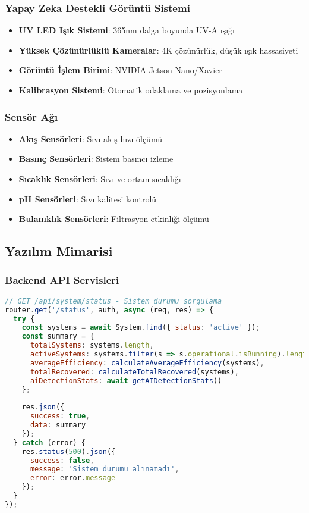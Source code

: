 \documentclass[12pt,a4paper]{article}
\begin{document}
\subsubsection{Yapay Zeka Destekli Görüntü Sistemi}
\begin{itemize}
    \item \textbf{UV LED Işık Sistemi}: 365nm dalga boyunda UV-A ışığı
    \item \textbf{Yüksek Çözünürlüklü Kameralar}: 4K çözünürlük, düşük ışık hassasiyeti
    \item \textbf{Görüntü İşlem Birimi}: NVIDIA Jetson Nano/Xavier
    \item \textbf{Kalibrasyon Sistemi}: Otomatik odaklama ve pozisyonlama
\end{itemize}

\subsubsection{Sensör Ağı}
\begin{itemize}
    \item \textbf{Akış Sensörleri}: Sıvı akış hızı ölçümü
    \item \textbf{Basınç Sensörleri}: Sistem basıncı izleme
    \item \textbf{Sıcaklık Sensörleri}: Sıvı ve ortam sıcaklığı
    \item \textbf{pH Sensörleri}: Sıvı kalitesi kontrolü
    \item \textbf{Bulanıklık Sensörleri}: Filtrasyon etkinliği ölçümü
\end{itemize}

\subsection{Yazılım Mimarisi}

\subsubsection{Backend API Servisleri}

\begin{lstlisting}[language=JavaScript, caption=Sistem Durumu API Endpoint]
// GET /api/system/status - Sistem durumu sorgulama
router.get('/status', auth, async (req, res) => {
  try {
    const systems = await System.find({ status: 'active' });
    const summary = {
      totalSystems: systems.length,
      activeSystems: systems.filter(s => s.operational.isRunning).length,
      averageEfficiency: calculateAverageEfficiency(systems),
      totalRecovered: calculateTotalRecovered(systems),
      aiDetectionStats: await getAIDetectionStats()
    };
    
    res.json({
      success: true,
      data: summary
    });
  } catch (error) {
    res.status(500).json({
      success: false,
      message: 'Sistem durumu alınamadı',
      error: error.message
    });
  }
});
\end{lstlisting}
\end{document}
